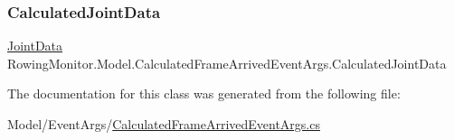\subsubsection{\texorpdfstring{Calculated\+Joint\+Data}{CalculatedJointData}}
{\footnotesize\ttfamily \hyperlink{struct_rowing_monitor_1_1_model_1_1_util_1_1_joint_data}{Joint\+Data} Rowing\+Monitor.\+Model.\+Calculated\+Frame\+Arrived\+Event\+Args.\+Calculated\+Joint\+Data\hspace{0.3cm}{\ttfamily [get]}}



The documentation for this class was generated from the following file\+:\begin{DoxyCompactItemize}
\item 
Model/\+Event\+Args/\hyperlink{_calculated_frame_arrived_event_args_8cs}{Calculated\+Frame\+Arrived\+Event\+Args.\+cs}\end{DoxyCompactItemize}
